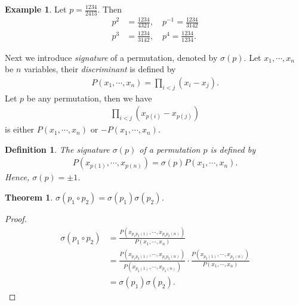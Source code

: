 \documentclass[11pt]{book}
\newtheorem{definition}{Definition}[section]
\newtheorem{theorem}{Theorem}[section]
\theoremstyle{definition}
\newtheorem{example}{Example}[section]
\numberwithin{equation}{chapter}
\begin{document}
\medskip

\begin{example}
Let $p = \frac{1234}{2413}$. Then
\begin{align*}
    p^2 & = \frac{1234}{4321},\quad p^{-1} = \frac{1234}{3142} \\
    p^3 & = \frac{1234}{3142},\quad p^{4} = \frac{1234}{1234}.
\end{align*}
\end{example}

\medskip

Next we introduce \emph{signature} of a permutation, denoted by $\sigma(p)$. Let $x_1,\cdots,x_n$ be $n$ variables, their \emph{discriminant} is defined by 
\begin{align*}
    P(x_1,\cdots,x_n) = \prod_{i < j}(x_i - x_j).
\end{align*}
Let $p$ be any permutation, then we have 
\begin{align*}
    \prod_{i < j}\left(x_{p(i)} - x_{p(j)} \right)
\end{align*}
is either $P(x_1,\cdots,x_n)$ or $- P(x_1,\cdots,x_n)$.

\medskip

\begin{definition}
The signature $\sigma(p)$  of a permutation $p$ is defined by
\begin{align*}
    P\left(x_{p(1)},\cdots,x_{p(n)}\right) = \sigma(p) P(x_1,\cdots,x_n).
\end{align*}
Hence, $\sigma(p) = \pm 1$.
\end{definition}

\medskip

\begin{theorem}
$\sigma(p_1\circ p_2) = \sigma(p_1) \sigma(p_2)$.
\end{theorem}
\begin{proof}
\begin{align*}
    \sigma(p_1\circ p_2) & = \frac{P\left(x_{p_1p_2(1)},\cdots,x_{p_1p_2(n)}\right)}{P(x_1,\cdots,x_n)} \\
    & = \frac{P\left(x_{p_1p_2(1)},\cdots,x_{p_1p_2(n)}\right)}{P(x_{p_2(1)},\cdots,x_{p_2(n)})}\cdot \frac{P\left(x_{p_2(1)},\cdots,x_{p_2(n)}\right)}{P(x_1,\cdots,x_n)}\\
    & = \sigma(p_1) \sigma(p_2).
\end{align*}
\end{proof}

\medskip
\end{document}
